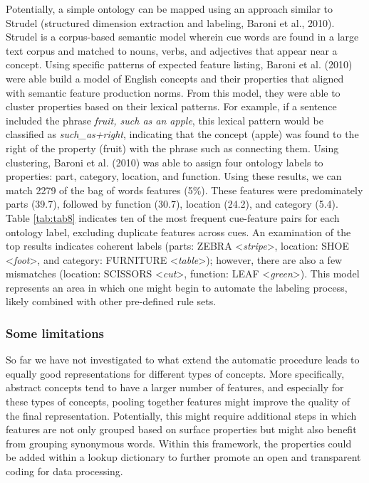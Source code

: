 \documentclass[man]{apa6}
\begin{document}
Potentially, a simple ontology can be mapped using an approach similar to Strudel (structured dimension extraction and labeling, Baroni et al., 2010). Strudel is a corpus-based semantic model wherein cue words are found in a large text corpus and matched to nouns, verbs, and adjectives that appear near a concept. Using specific patterns of expected feature listing, Baroni et al. (2010) were able build a model of English concepts and their properties that aligned with semantic feature production norms. From this model, they were able to cluster properties based on their lexical patterns. For example, if a sentence included the phrase \emph{fruit, such as an apple}, this lexical pattern would be classified as \emph{such\_as+right}, indicating that the concept (apple) was found to the right of the property (fruit) with the phrase such as connecting them. Using clustering, Baroni et al. (2010) was able to assign four ontology labels to properties: part, category, location, and function. Using these results, we can match 2279 of the bag of words features (5\%). These features were predominately parts (39.7), followed by function (30.7), location (24.2), and category (5.4). Table \ref{tab:tab8} indicates ten of the most frequent cue-feature pairs for each ontology label, excluding duplicate features across cues. An examination of the top results indicates coherent labels (parts: ZEBRA \textless{}\emph{stripe}\textgreater{}, location: SHOE \textless{}\emph{foot}\textgreater{}, and category: FURNITURE \textless{}\emph{table}\textgreater{}); however, there are also a few mismatches (location: SCISSORS \textless{}\emph{cut}\textgreater{}, function: LEAF \textless{}\emph{green}\textgreater{}). This model represents an area in which one might begin to automate the labeling process, likely combined with other pre-defined rule sets.

\hypertarget{some-limitations}{%
\subsubsection{Some limitations}\label{some-limitations}}

So far we have not investigated to what extend the automatic procedure leads to equally good representations for different types of concepts. More specifically, abstract concepts tend to have a larger number of features, and especially for these types of concepts, pooling together features might improve the quality of the final representation. Potentially, this might require additional steps in which features are not only grouped based on surface properties but might also benefit from grouping synonymous words. Within this framework, the properties could be added within a lookup dictionary to further promote an open and transparent coding for data processing.
\end{document}
